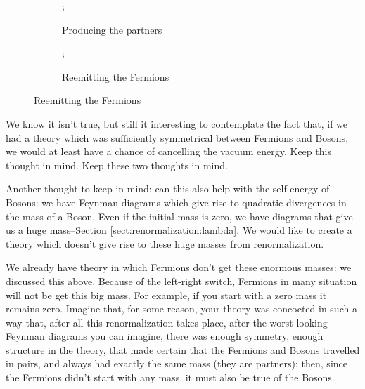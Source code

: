 \documentclass[]{article}
\begin{document}
\begin{figure}[H]
	\begin{center}
		\caption{Why there isn't a Boson equivalent to the electron}
		\begin{subfigure}{0.45\textwidth}
			\caption{Producing the partners}\label{fig:partners}
			;
		\end{subfigure}
		\begin{subfigure}{0.45\textwidth}
			\caption{Reemitting the Fermions}\label{fig:re:emit}
			;
		\end{subfigure}
	\end{center}
\end{figure}

We know it isn't true, but still it interesting to contemplate the fact that,  if we had a theory which was sufficiently symmetrical between Fermions and Bosons, we would at least have a chance of cancelling the vacuum energy. Keep this thought in mind.
 Keep these two thoughts in mind.

Another thought to keep in mind: can this also help with the self-energy of Bosons: we have Feynman diagrams which give rise to quadratic divergences in the mass of a Boson. Even if the initial mass is zero, we have diagrams that give us a huge mass--Section \ref{sect:renormalization:lambda}. We would like to create a theory which doesn't give rise to these huge masses from renormalization.


We already have theory in which Fermions don't get these enormous masses: we discussed this above. Because of the left-right switch, Fermions in many situation will not be get this big mass. For example, if you start with a zero mass it remains zero. Imagine that, for some reason, your theory was concocted in such a way that, after all this renormalization takes place, after the worst looking Feynman diagrams you can imagine, there was enough symmetry, enough structure in the theory, that made certain that the Fermions and Bosons travelled in pairs, and always had exactly the same mass (they are partners); then, since the Fermions didn't start with any mass, it must also be true of the Bosons.
\end{document}
